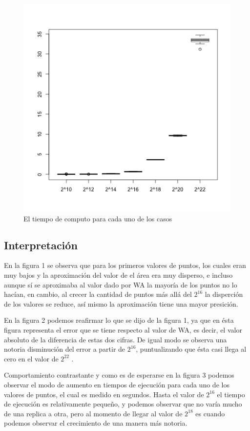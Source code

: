 \documentclass[a4paper]{article}
\begin{document}
\begin{figure}[!]
\centering
\includegraphics[width=0.7\linewidth]{tiempos}
\caption{El tiempo de computo para cada uno de los casos}
\label{fig:tiempos}
\end{figure}


\subsection{Interpretación}
En la figura 1 se observa que para los primeros valores de puntos, los cuales eran muy bajos y la aproximación del valor de el área era muy disperso, e incluso aunque sí se aproximaba al valor dado por WA la mayoría de los puntos no lo hacían, en cambio, al crecer la cantidad de puntos más allá del $2^{16}$ la disperción de los valores se reduce, así mismo la aproximación tiene una mayor presición.

En la figura 2 podemos reafirmar lo que se dijo de la figura 1, ya que en ésta figura representa el error que se tiene respecto al valor de WA, es decir, el valor absoluto de la diferencia de estas dos cifras. De igual modo se observa una notoria disminución del error a partir de $2^{16}$, puntualizando que ésta casi llega al cero en el valor de $2^{22}$ .

Comportamiento contrastante y como es de esperarse en la figura 3 podemos observar el modo de aumento en tiempos de ejecución para cada uno de los valores de puntos, el cual es medido en segundos. Hasta el valor de $2^{16}$ el tiempo de ejecución es relativamente pequeño, y podemos observar que no varía mucho de una replica a otra, pero al momento de llegar al valor de $2^{18}$ es cuando podemos observar el crecimiento de una manera más notoria.
 
\end{document}

